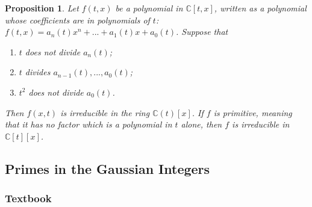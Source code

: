 \documentclass[12pt]{article}
\newtheorem{prop}[thm]{Proposition}
\theoremstyle{definition}
\theoremstyle{remark}
\numberwithin{equation}{section}
\newcommand\C{\mathbb C}    %
\begin{document}
\vspace{15pt}

\begin{prop}
        Let $f(t,x)$ be a polynomial in $\C[t,x]$, written as a polynomial whose coefficients are in polynomials of $t$: $f(t,x) = a_n(t)x^n + ... + a_1(t)x+a_0(t)$. Suppose that \begin{enumerate}
                \item $t$ does not divide $a_n(t)$;
                \item $t$ divides $a_{n-1}(t),...,a_0(t)$;
                \item $t^2$ does not divide $a_0(t)$.
        \end{enumerate}
        Then $f(x,t)$ is irreducible in the ring $\C(t)[x]$. If $f$ is primitive, meaning that it has no factor which is a polynomial in $t$ alone, then $f$ is irreducible in $\C[t][x]$.
\end{prop}


\vspace{15pt}

\subsection{Primes in the Gaussian Integers}


\subsubsection{Textbook}
\end{document}
